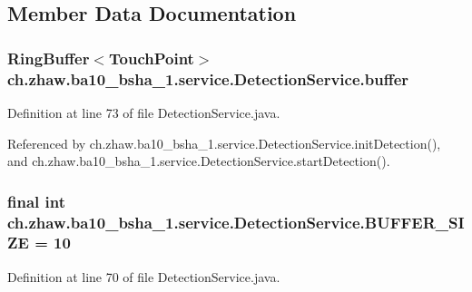 \subsection{Member Data Documentation}
\hypertarget{classch_1_1zhaw_1_1ba10__bsha__1_1_1service_1_1DetectionService_a9188c843a530615bdd8c2e031879224b}{
\subsubsection[{buffer}]{\setlength{\rightskip}{0pt plus 5cm}RingBuffer$<${\bf TouchPoint}$>$ {\bf ch.zhaw.ba10\_\-bsha\_\-1.service.DetectionService.buffer}}}
\label{classch_1_1zhaw_1_1ba10__bsha__1_1_1service_1_1DetectionService_a9188c843a530615bdd8c2e031879224b}


Definition at line 73 of file DetectionService.java.

Referenced by ch.zhaw.ba10\_\-bsha\_\-1.service.DetectionService.initDetection(), and ch.zhaw.ba10\_\-bsha\_\-1.service.DetectionService.startDetection().\hypertarget{classch_1_1zhaw_1_1ba10__bsha__1_1_1service_1_1DetectionService_a9702db5e460b3123f4c475b05ed6942f}{
\subsubsection[{BUFFER\_\-SIZE}]{\setlength{\rightskip}{0pt plus 5cm}final int {\bf ch.zhaw.ba10\_\-bsha\_\-1.service.DetectionService.BUFFER\_\-SIZE} = 10}}
\label{classch_1_1zhaw_1_1ba10__bsha__1_1_1service_1_1DetectionService_a9702db5e460b3123f4c475b05ed6942f}


Definition at line 70 of file DetectionService.java.

